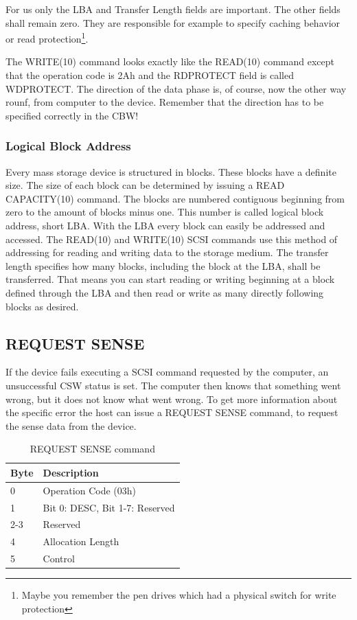 For us only the LBA and Transfer Length fields are important. The other fields shall remain zero. They are responsible for example to specify caching behavior or read protection\footnote{Maybe you remember the pen drives which had a physical switch for write protection}.

The WRITE(10) command looks exactly like the READ(10) command except that the operation code is 2Ah and the RDPROTECT field is called WDPROTECT. The direction of the data phase is, of course, now the other way rounf, from computer to the device. Remember that the direction has to be specified correctly in the CBW!

\subsubsection{Logical Block Address}

Every mass storage device is structured in blocks. These blocks have a definite size. The size of each block can be determined by issuing a READ CAPACITY(10) command. The blocks are numbered contiguous beginning from zero to the amount of blocks minus one. This number is called logical block address, short LBA. With the LBA every block can easily be addressed and accessed. The READ(10) and WRITE(10) SCSI commands use this method of addressing for reading and writing data to the storage medium. The transfer length specifies how many blocks, including the block at the LBA, shall be transferred. That means you can start reading or writing beginning at a block defined through the LBA and then read or write as many directly following blocks as desired.

\subsection{REQUEST SENSE}

If the device fails executing a SCSI command requested by the computer, an unsuccessful CSW status is set. The computer then knows that something went wrong, but it does not know what went wrong. To get more information about the specific error the host can issue a REQUEST SENSE command, to request the sense data from the device.

\begin{table}[ht]
\caption{REQUEST SENSE command\cite{scsi_seagate}}
\centering
\begin{tabular}{|l|l|}
\hline\hline
\textbf{Byte} & \textbf{Description}\\ \hline
0 & Operation Code (03h)\\ \hline
1 & Bit 0: DESC, Bit 1-7: Reserved \\ \hline
2-3 & Reserved \\ \hline
4 & Allocation Length \\ \hline
5 & Control \\ \hline
\end{tabular}
\label{table:request_sense}
\end{table}


